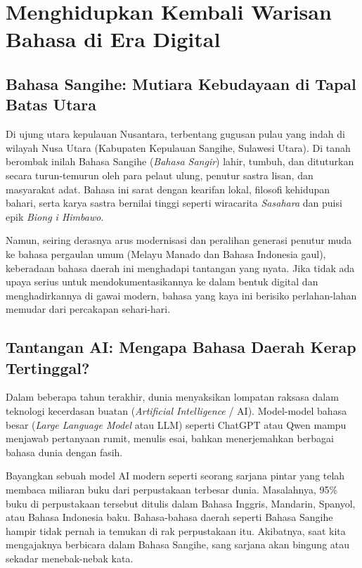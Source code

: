 \chapter{Menghidupkan Kembali Warisan Bahasa di Era Digital}

\section{Bahasa Sangihe: Mutiara Kebudayaan di Tapal Batas Utara}
Di ujung utara kepulauan Nusantara, terbentang gugusan pulau yang indah di wilayah Nusa Utara (Kabupaten Kepulauan Sangihe, Sulawesi Utara). Di tanah berombak inilah Bahasa Sangihe (\textit{Bahasa Sangir}) lahir, tumbuh, dan dituturkan secara turun-temurun oleh para pelaut ulung, penutur sastra lisan, dan masyarakat adat. Bahasa ini sarat dengan kearifan lokal, filosofi kehidupan bahari, serta karya sastra bernilai tinggi seperti wiracarita \textit{Sasahara} dan puisi epik \textit{Biong i Himbawo}.

Namun, seiring derasnya arus modernisasi dan peralihan generasi penutur muda ke bahasa pergaulan umum (Melayu Manado dan Bahasa Indonesia gaul), keberadaan bahasa daerah ini menghadapi tantangan yang nyata. Jika tidak ada upaya serius untuk mendokumentasikannya ke dalam bentuk digital dan menghadirkannya di gawai modern, bahasa yang kaya ini berisiko perlahan-lahan memudar dari percakapan sehari-hari.

\section{Tantangan AI: Mengapa Bahasa Daerah Kerap Tertinggal?}
Dalam beberapa tahun terakhir, dunia menyaksikan lompatan raksasa dalam teknologi kecerdasan buatan (\textit{Artificial Intelligence} / AI). Model-model bahasa besar (\textit{Large Language Model} atau LLM) seperti ChatGPT atau Qwen mampu menjawab pertanyaan rumit, menulis esai, bahkan menerjemahkan berbagai bahasa dunia dengan fasih.

\begin{infobox}
Bayangkan sebuah model AI modern seperti seorang sarjana pintar yang telah membaca miliaran buku dari perpustakaan terbesar dunia. Masalahnya, 95\% buku di perpustakaan tersebut ditulis dalam Bahasa Inggris, Mandarin, Spanyol, atau Bahasa Indonesia baku. Bahasa-bahasa daerah seperti Bahasa Sangihe hampir tidak pernah ia temukan di rak perpustakaan itu. Akibatnya, saat kita mengajaknya berbicara dalam Bahasa Sangihe, sang sarjana akan bingung atau sekadar menebak-nebak kata.
\end{infobox}

